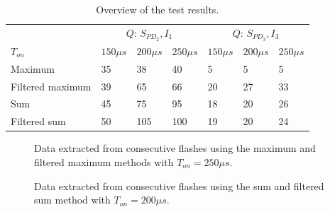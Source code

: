 \begin{table}[]
	\centering
\begin{tabular}{l|lll|lll|}
	& \multicolumn{3}{c|}{$Q$: $S_{PD_2}, I_1$} & \multicolumn{3}{c|}{$Q$: $S_{PD_3}, I_3$} \\
	$T_{on}$         & $150 \mu s$ & $200\mu s$ & $250\mu s$ & $150\mu s$  & $200\mu s$  & $250\mu s$  \\ \hline
	Maximum          & 35          & 38         & 40         & 5           & 5          & 5          \\
	Filtered maximum & 39          & 65         & 66         & 20          & 27         & 33         \\
	Sum              & 45          & 75         & 95         & 18          & 20         & 26         \\
	Filtered sum     & 50          & 105        & 100        & 19          & 20         & 24        
\end{tabular}
	\caption{Overview of the test results.\label{SNR_results}}
\end{table}


\begin{figure}
	\centering     %
	\caption{Data extracted from consecutive flashes using the maximum and filtered maximum methods with $T_{on} = 250\mu s$.\label{fig:SimpleFeatures}}
\end{figure}

\begin{figure}
	\centering     %
	\caption{Data extracted from consecutive flashes using the sum and filtered sum method with $T_{on} = 200\mu s$.\label{fig:complexFeatures}}
\end{figure}

